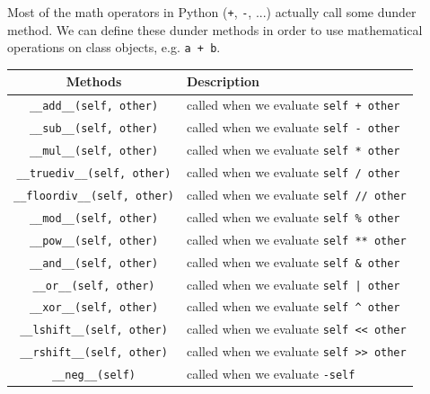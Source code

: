   \begin{definition}
    \label{def:mathematical-operations}
 
    Most of the math operators in Python (\texttt{+}, \texttt{-}, ...) actually call some dunder method. We can define these dunder methods in order to use mathematical operations on class objects, e.g. \texttt{a + b}. 

    \begin{table}[H]
      \centering
      \begin{tabular}{|c|p{8cm}|}
        \hline
        \textbf{Methods} & \textbf{Description} \\
        \hline 
        \texttt{\_\_add\_\_(self, other)} & called when we evaluate \texttt{self + other} \\
        \hline
        \texttt{\_\_sub\_\_(self, other)} & called when we evaluate \texttt{self - other} \\
        \hline
        \texttt{\_\_mul\_\_(self, other)} & called when we evaluate \texttt{self * other} \\
        \hline
        \texttt{\_\_truediv\_\_(self, other)} & called when we evaluate \texttt{self / other} \\
        \hline
        \texttt{\_\_floordiv\_\_(self, other)} & called when we evaluate \texttt{self // other} \\
        \hline
        \texttt{\_\_mod\_\_(self, other)} & called when we evaluate \texttt{self \% other} \\
        \hline
        \texttt{\_\_pow\_\_(self, other)} & called when we evaluate \texttt{self ** other} \\
        \hline
        \texttt{\_\_and\_\_(self, other)} & called when we evaluate \texttt{self \& other} \\
        \hline
        \texttt{\_\_or\_\_(self, other)} & called when we evaluate \texttt{self | other} \\
        \hline
        \texttt{\_\_xor\_\_(self, other)} & called when we evaluate \texttt{self \^{} other} \\
        \hline
        \texttt{\_\_lshift\_\_(self, other)} & called when we evaluate \texttt{self << other} \\
        \hline
        \texttt{\_\_rshift\_\_(self, other)} & called when we evaluate \texttt{self >> other} \\
        \hline
        \texttt{\_\_neg\_\_(self)} & called when we evaluate \texttt{-self} \\

\end{tabular}
\end{table}
\end{definition}
